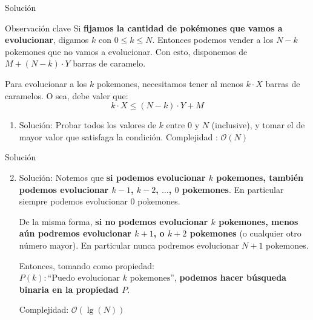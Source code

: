 \documentclass{beamer}
\begin{document}
\begin{frame}{Solución}
	\pause
	\begin{block}{Observación clave}
	Si \textbf{fijamos la cantidad de pokémones que vamos a evolucionar}, digamos $k$ con $0 \leq k \leq N$. Entonces podemos vender a los $N-k$ pokemones que no vamos a evolucionar. Con esto, disponemos de $M + (N-k) \cdot Y$ barras de caramelo. 
	
	Para evolucionar a los $k$ pokemones, necesitamos tener al menos $k \cdot X$ barras de caramelos. O sea, debe valer que:
	$$ k \cdot X \leq (N-k)\cdot Y + M $$ 
	\end{block}
	\begin{enumerate}
		\pause
		\item Solución: Probar todos los valores de $k$ entre $0$ y $N$ (inclusive), y tomar el de mayor valor que satisfaga la condición. Complejidad : $\mathcal{O}(N)$
	\end{enumerate}
\end{frame}

\begin{frame}{Solución}
	\begin{enumerate}
		\setcounter{enumi}{1}
		\pause
		\item Solución: Notemos que \textbf{si podemos evolucionar $k$ pokemones, también podemos evolucionar $k-1$, $k-2$, $\dots$, $0$ pokemones}. En particular siempre podemos evolucionar $0$ pokemones. 
		
		De la misma forma, \textbf{si no podemos evolucionar $k$ pokemones, menos aún podremos evolucionar $k+1$, o $k+2$ pokemones} (o cualquier otro número mayor). En particular nunca podremos evolucionar $N+1$ pokemones.
		\pause
		
		Entonces, tomando como propiedad: $P(k) : \text{``Puedo evolucionar } k \text{ pokemones''}$, \textbf{podemos hacer búsqueda binaria en la propiedad $P$}.
		\pause
		
		Complejidad: $\mathcal{O}(\lg(N))$
	\end{enumerate}
\end{frame}
\end{document}

